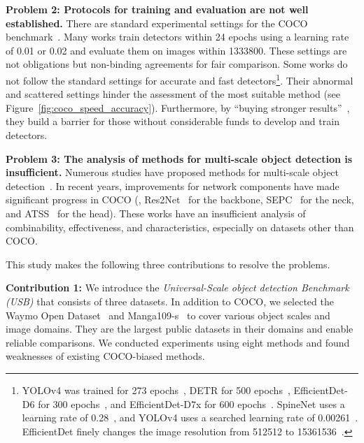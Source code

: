 \documentclass[10pt,twocolumn,letterpaper]{article}
\newcommand{\Mangas}{Manga109-s\xspace}
\begin{document}
\textbf{Problem 2: Protocols for training and evaluation are not well established.}
There are standard experimental settings for the COCO benchmark~\cite{Detectron2018, MMDetection, FPN_CVPR2017, RetinaNet_ICCV2017, FCOS_ICCV2019, ATSS_CVPR2020, GFL_NeurIPS2020}.
Many works train detectors within 24 epochs
using a learning rate of 0.01 or 0.02
and evaluate them on images within 1333800.
These settings are not obligations but non-binding agreements for fair comparison.
Some works do not follow the standard settings for accurate and fast detectors\footnote{YOLOv4 was trained for 273 epochs~\cite{YOLOv4_2020},
DETR for 500 epochs~\cite{DETR_ECCV2020},
EfficientDet-D6 for 300 epochs~\cite{EfficientDet_CVPR2020},
and EfficientDet-D7x for 600 epochs~\cite{EfficientDet_arXiv}.
SpineNet uses a learning rate of 0.28~\cite{SpineNet_CVPR2020},
and YOLOv4 uses a searched learning rate of 0.00261~\cite{YOLOv4_2020}.
EfficientDet finely changes the image resolution from 512512 to 15361536~\cite{EfficientDet_CVPR2020}.}.
Their abnormal and scattered settings hinder the assessment of the most suitable method
(see Figure~\ref{fig:coco_speed_accuracy}).
Furthermore,
by ``buying stronger results''~\cite{GreenAI_CACM2020},
they build a barrier for those without considerable funds to develop and train detectors.






\textbf{Problem 3: The analysis of methods for multi-scale object detection is insufficient.}
Numerous studies have proposed methods for multi-scale object detection~\cite{object_detection_survey_Liu_IJCV2020, Faster_R-CNN_NIPS2015, SSD_ECCV2016, FPN_CVPR2017, DCN_ICCV2017}.
In recent years, improvements for network components have made significant progress in COCO
(\eg, Res2Net~\cite{Res2Net_TPAMI2020} for the backbone, SEPC~\cite{SEPC_CVPR2020} for the neck, and ATSS~\cite{ATSS_CVPR2020} for the head).
These works have an insufficient analysis of
combinability, effectiveness, and characteristics, especially on datasets other than COCO.

This study makes the following three contributions to resolve the problems.

\textbf{Contribution 1:}
We introduce the \textit{Universal-Scale object detection Benchmark (USB)} that consists of three datasets.
In addition to COCO, we selected the Waymo Open Dataset~\cite{WaymoOpenDataset_CVPR2020} and \Mangas~\cite{Manga109_Matsui_MTAP2017, Manga109_Aizawa_IEEEMM2020} to cover various object scales and image domains.
They are the largest public datasets in their domains and enable reliable comparisons.
We conducted experiments using eight methods and found weaknesses of existing COCO-biased methods.
\end{document}
